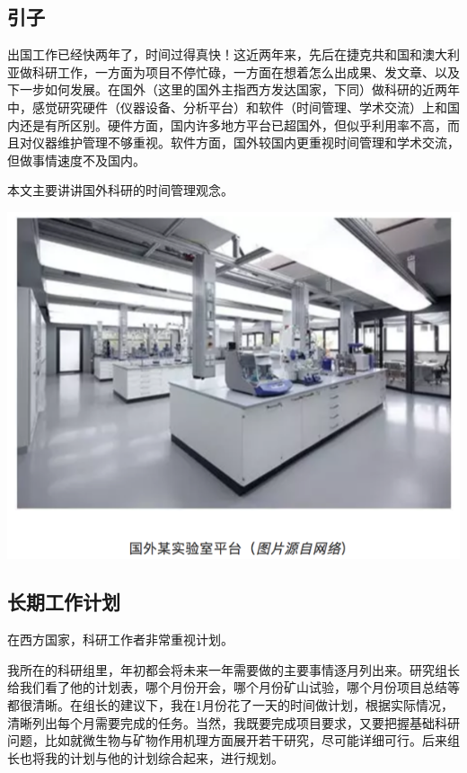 \documentclass[]{book}
\begin{document}
\hypertarget{ux5f15ux5b50}{%
\subsection{引子}\label{ux5f15ux5b50}}

出国工作已经快两年了，时间过得真快！这近两年来，先后在捷克共和国和澳大利亚做科研工作，一方面为项目不停忙碌，一方面在想着怎么出成果、发文章、以及下一步如何发展。在国外（这里的国外主指西方发达国家，下同）做科研的近两年中，感觉研究硬件（仪器设备、分析平台）和软件（时间管理、学术交流）上和国内还是有所区别。硬件方面，国内许多地方平台已超国外，但似乎利用率不高，而且对仪器维护管理不够重视。软件方面，国外较国内更重视时间管理和学术交流，但做事情速度不及国内。

本文主要讲讲国外科研的时间管理观念。

\includegraphics[width=8.33in]{images/osre1}

\hypertarget{ux957fux671fux5de5ux4f5cux8ba1ux5212}{%
\subsection{长期工作计划}\label{ux957fux671fux5de5ux4f5cux8ba1ux5212}}

在西方国家，科研工作者非常重视计划。

我所在的科研组里，年初都会将未来一年需要做的主要事情逐月列出来。研究组长给我们看了他的计划表，哪个月份开会，哪个月份矿山试验，哪个月份项目总结等都很清晰。在组长的建议下，我在1月份花了一天的时间做计划，根据实际情况，清晰列出每个月需要完成的任务。当然，我既要完成项目要求，又要把握基础科研问题，比如就微生物与矿物作用机理方面展开若干研究，尽可能详细可行。后来组长也将我的计划与他的计划综合起来，进行规划。
\end{document}
